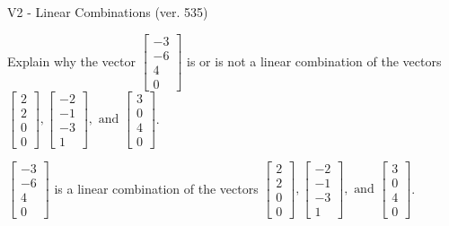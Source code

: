 \begin{exercise}
  \begin{exerciseTitle}V2 - Linear Combinations (ver. 535)\end{exerciseTitle}
  \begin{exerciseStatement}
    Explain why the vector \(\left[\begin{array}{c}
-3 \\
-6 \\
4 \\
0
\end{array}\right]\)  is or is not a linear 
	combination of the vectors \(\left[\begin{array}{c}
2 \\
2 \\
0 \\
0
\end{array}\right] , \left[\begin{array}{c}
-2 \\
-1 \\
-3 \\
1
\end{array}\right] , \text{ and } \left[\begin{array}{c}
3 \\
0 \\
4 \\
0
\end{array}\right]\).
	


  \end{exerciseStatement}
  \begin{exerciseAnswer}
   \(\left[\begin{array}{c}
-3 \\
-6 \\
4 \\
0
\end{array}\right]\) 
  	 is  
	a linear combination of the vectors \(\left[\begin{array}{c}
2 \\
2 \\
0 \\
0
\end{array}\right] , \left[\begin{array}{c}
-2 \\
-1 \\
-3 \\
1
\end{array}\right] , \text{ and } \left[\begin{array}{c}
3 \\
0 \\
4 \\
0
\end{array}\right]\).

	
  


  \end{exerciseAnswer}
\end{exercise}